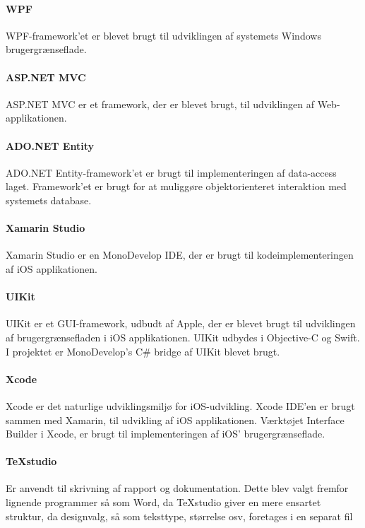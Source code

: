 \paragraph{WPF}
WPF-framework'et er blevet brugt til udviklingen af systemets Windows brugergrænseflade.

\paragraph{ASP.NET MVC}
ASP.NET MVC er et framework, der er blevet brugt, til udviklingen af Web-applikationen.

\paragraph{ADO.NET Entity}
ADO.NET Entity-framework'et er brugt til implementeringen af data-access laget. Framework'et er brugt for at muliggøre objektorienteret interaktion med systemets database.

\paragraph{Xamarin Studio}
Xamarin Studio er en MonoDevelop IDE, der er brugt til kodeimplementeringen af iOS applikationen.

\paragraph{UIKit}
UIKit er et GUI-framework, udbudt af Apple, der er blevet brugt til udviklingen af brugergrænsefladen i iOS applikationen. UIKit udbydes i Objective-C og Swift. I projektet er MonoDevelop's C\# bridge af UIKit blevet brugt.

\paragraph{Xcode}
Xcode er det naturlige udviklingsmiljø for iOS-udvikling. Xcode IDE'en er brugt sammen med Xamarin, til udvikling af iOS applikationen. Værktøjet Interface Builder i Xcode, er brugt til implementeringen af iOS' brugergrænseflade.

\paragraph{TeXstudio}
Er anvendt til skrivning af rapport og dokumentation. Dette blev valgt fremfor lignende programmer så som Word, da TeXstudio giver en mere ensartet struktur, da designvalg, så som teksttype, størrelse osv, foretages i en separat fil


